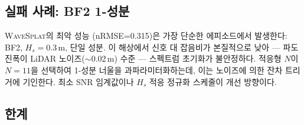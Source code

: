 \documentclass[11pt]{report}
\numberwithin{equation}{chapter}
\numberwithin{figure}{chapter}
\numberwithin{table}{chapter}
\newcommand{\WS}{\textsc{WaveSplat}}
\begin{document}
\subsection{실패 사례: BF2 1-성분}

\WS{}의 최악 성능 (nRMSE=0.315)은 가장 단순한 에피소드에서 발생한다:
BF2, $H_s=0.3$\,m, 단일 성분.
이 해상에서 신호 대 잡음비가 본질적으로 낮아 ---
파도 진폭이 LiDAR 노이즈($\sim$0.02\,m) 수준 --- 스펙트럼 초기화가 불안정하다.
적응형 $N$이 $N=11$을 선택하여 1-성분 너울을 과파라미터화하는데,
이는 노이즈에 의한 잔차 트리거에 기인한다.
최소 SNR 임계값이나 $H_s$ 적응 정규화 스케줄이 개선 방향이다.

\subsection{한계}
\label{sec:limitations}
\end{document}
